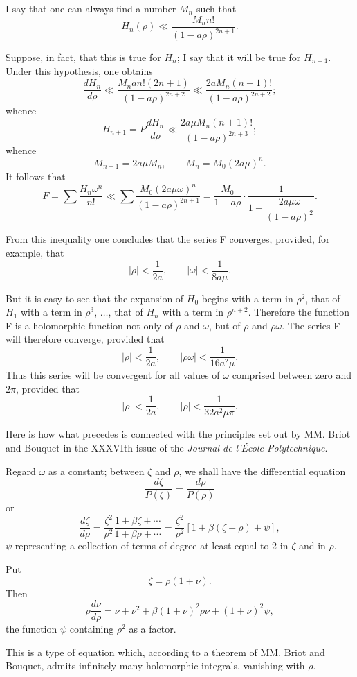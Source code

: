 \documentclass[11pt]{article}
\begin{document}
I say that one can always find a number $M_n$ such that
\[
H_n(\rho)\ll\frac{M_n n!}{(1-a\rho)^{2n+1}}.
\]

Suppose, in fact, that this is true for $H_n$; I say that it will be true for $H_{n+1}$. Under this hypothesis, one obtains
\[
\frac{dH_n}{d\rho}\ll
\frac{M_n a n!(2n+1)}{(1-a\rho)^{2n+2}}
\ll
\frac{2aM_n(n+1)!}{(1-a\rho)^{2n+2}};
\]
whence
\[
H_{n+1}=P\frac{dH_n}{d\rho}
\ll
\frac{2a\mu M_n(n+1)!}{(1-a\rho)^{2n+3}};
\]
whence
\[
M_{n+1}=2a\mu M_n,
\qquad
M_n=M_0(2a\mu)^n.
\]
It follows that
\[
F=\sum\frac{H_n\omega^n}{n!}
\ll
\sum\frac{M_0(2a\mu\omega)^n}{(1-a\rho)^{2n+1}}
=\frac{M_0}{1-a\rho}\cdot\frac{1}{1-\dfrac{2a\mu\omega}{(1-a\rho)^2}}.
\]

From this inequality one concludes that the series F converges, provided, for example, that
\[
|\rho|<\frac{1}{2a},
\qquad
|\omega|<\frac{1}{8a\mu}.
\]

But it is easy to see that the expansion of $H_0$ begins with a term in $\rho^2$, that of $H_1$ with a term in $\rho^3$, $\ldots$, that of $H_n$ with a term in $\rho^{n+2}$. Therefore the function F is a holomorphic function not only of $\rho$ and $\omega$, but of $\rho$ and $\rho\omega$. The series F will therefore converge, provided that
\[
|\rho|<\frac{1}{2a},
\qquad
|\rho\omega|<\frac{1}{16a^2\mu}.
\]
Thus this series will be convergent for all values of $\omega$ comprised between zero and $2\pi$, provided that
\[
|\rho|<\frac{1}{2a},
\qquad
|\rho|<\frac{1}{32a^2\mu\pi}.
\]

Here is how what precedes is connected with the principles set out by MM. Briot and Bouquet in the XXXVIth issue of the \emph{Journal de l’École Polytechnique}.

Regard $\omega$ as a constant; between $\zeta$ and $\rho$, we shall have the differential equation
\[
\frac{d\zeta}{P(\zeta)}=\frac{d\rho}{P(\rho)}
\]
or
\[
\frac{d\zeta}{d\rho}
=\frac{\zeta^2}{\rho^2}\frac{1+\beta\zeta+\cdots}{1+\beta\rho+\cdots}
=\frac{\zeta^2}{\rho^2}[1+\beta(\zeta-\rho)+\psi],
\]
$\psi$ representing a collection of terms of degree at least equal to 2 in $\zeta$ and in $\rho$.

Put
\[
\zeta=\rho(1+\nu).
\]
Then
\[
\rho\frac{d\nu}{d\rho}=\nu+\nu^2+\beta(1+\nu)^2\rho\nu+(1+\nu)^2\psi,
\]
the function $\psi$ containing $\rho^2$ as a factor.

This is a type of equation which, according to a theorem of MM. Briot and Bouquet, admits infinitely many holomorphic integrals, vanishing with $\rho$.
\end{document}
